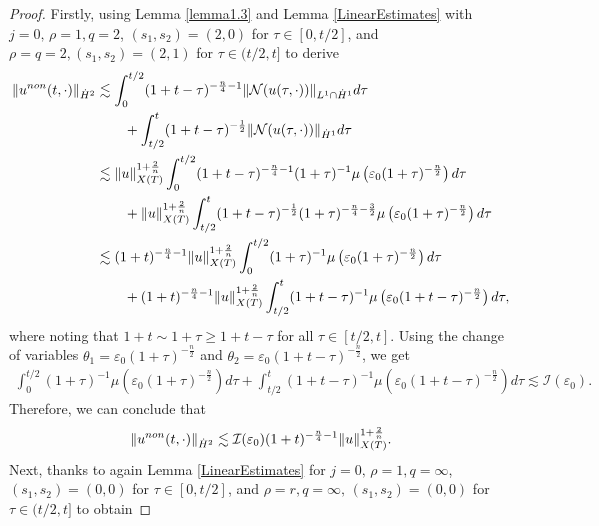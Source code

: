 \documentclass[10pt,a4paper]{amsart}
\begin{document}
     \begin{proof}
         Firstly, using Lemma \ref{lemma1.3} and
         Lemma \ref{LinearEstimates} with $ j= 0, \,\rho = 1, q = 2$, $(s_1, s_2) =(2,0)$ for $\tau \in [0, t/2]$, and $\rho=q =2, (s_1,s_2) =(2,1)$ for $\tau \in (t/2, t]$ to derive
         \begin{align*}
             \| u^{\rm non}(t,\cdot)\|_{\dot{H}^2} &\lesssim \int_0^{t/2} (1+t-\tau)^{-\frac{n}{4}-1} \| \mathcal{N}(u(\tau,\cdot))\|_{L^1 \cap \dot{H}^1} d\tau\\
             &\qquad + \int_{t/2}^t (1+t-\tau)^{-\frac{1}{2}} \| \mathcal{N}(u(\tau,\cdot))\|_{ \dot{H}^1} d\tau\\
             &\lesssim \|u\|_{X(T)}^{1+\frac{2}{n}}\int_0^{t/2} (1+t-\tau)^{-\frac{n}{4}-1} (1+\tau)^{-1} \mu\left(\varepsilon_0 (1+\tau)^{-\frac{n}{2}}\right) d\tau\\
             &\qquad + \|u\|_{X(T)}^{1+\frac{2}{n}}\int_{t/2}^t (1+t-\tau)^{-\frac{1}{2}} (1+\tau)^{-\frac{n}{4}-\frac{3}{2}} \mu\left(\varepsilon_0 (1+\tau)^{-\frac{n}{2}}\right) d\tau\\
             &\lesssim  (1+t)^{-\frac{n}{4}-1}\|u\|_{X(T)}^{1+\frac{2}{n}} \int_0^{t/2}(1+\tau)^{-1} \mu\left(\varepsilon_0 (1+\tau)^{-\frac{n}{2}}\right) d\tau\\
             &\qquad +  (1+t)^{-\frac{n}{4}-1}\|u\|_{X(T)}^{1+\frac{2}{n}} \int_{t/2}^t (1+t-\tau)^{-1} \mu\left(\varepsilon_0 (1+t-\tau)^{-\frac{n}{2}}\right) d\tau,
         \end{align*}
where noting that $1+t \sim 1+\tau \geq 1+t-\tau$ for all $\tau \in [t/2, t]$. Using the change of variables $\theta_1 = \varepsilon_0 (1+\tau)^{-\frac{n}{2}}$ and $\theta_2 = \varepsilon_0(1+t-\tau)^{-\frac{n}{2}}$, we get
\begin{align}
    \int_0^{t/2} (1+\tau)^{-1} \mu\left(\varepsilon_0 (1+\tau)^{-\frac{n}{2}}\right) d\tau   +
    \int_{t/2}^{t} (1+t-\tau)^{-1} \mu\left(\varepsilon_0 (1+t-\tau)^{-\frac{n}{2}}\right) d\tau \lesssim \mathcal{I}(\varepsilon_0). \label{Impor_Re1}
\end{align}
Therefore, we can conclude that 
    \begin{align}
        \|u^{\rm non}(t,\cdot)\|_{\dot{H}^2} \lesssim \mathcal{I}(\varepsilon_0)(1+t)^{-\frac{n}{4}-1} \|u\|_{X(T)}^{1+\frac{2}{n}}. \label{Main.Es.1}
    \end{align}
 Next, thanks to again 
         Lemma \ref{LinearEstimates} for $j =0, \,\rho = 1, q = \infty$, $(s_1, s_2) = (0,0)$ for $\tau \in [0, t/2]$, and $\rho =r, q= \infty, \,(s_1, s_2) =(0,0)$ for $\tau \in (t/2, t]$ to obtain

\end{proof}
\end{document}
